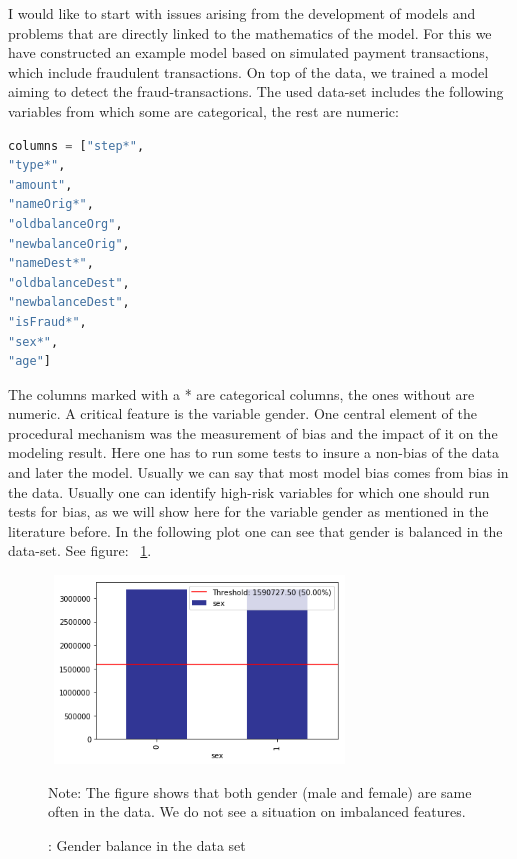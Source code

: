 \documentclass[jou,apacite]{apa6}
\begin{document}
I would like to start with issues arising from the development of models and problems that are directly linked to the mathematics of the model. For this we have constructed an example model based on simulated payment transactions, which include fraudulent transactions. On top of the data, we trained a model aiming to detect the fraud-transactions. The used data-set includes the following variables from which some are categorical, the rest are numeric:

\begin{lstlisting}[language=Python]
columns = ["step*",
"type*",
"amount",
"nameOrig*",
"oldbalanceOrg",
"newbalanceOrig",
"nameDest*",
"oldbalanceDest",
"newbalanceDest",
"isFraud*",
"sex*",
"age"]
\end{lstlisting}

The columns marked with a * are categorical columns, the ones without are numeric. A critical feature is the variable gender. One central element of the procedural mechanism was the measurement of bias and the impact of it on the modeling result. Here one has to run some tests to insure a non-bias of the data and later the model. Usually we can say that most model bias comes from bias in the data. Usually one can identify high-risk variables for which one should run tests for bias, as we will show here for the variable gender as mentioned in the literature before. In the following plot one can see that gender is balanced in the data-set. See figure: ~\ref{sch:gender}.

\begin{figure}[htb!]
\includegraphics[width=8cm, height=5cm]{genderbalance.png}
\caption{: Gender balance in the data set}
\medskip %
\begin{minipage}{0.45\textwidth} %
{\footnotesize Note: The figure shows that both gender (male and female) are same often in the data. We do not see a situation on imbalanced features.\par}
\end{minipage}
\label{sch:gender}
\end{figure}
\end{document}
